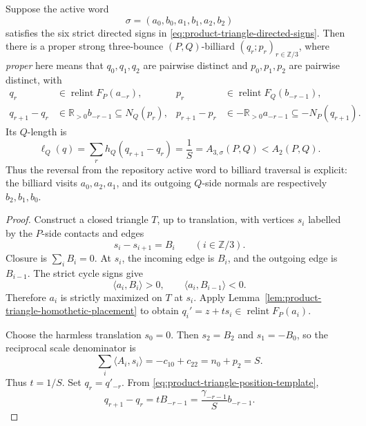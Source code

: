 \begin{unverified}
\begin{proposition}
\label{prop:product-triangle-strict-physical-realization}
Suppose the active word
\[
 \sigma=(a_0,b_0,a_1,b_1,a_2,b_2)
\]
satisfies the six strict directed signs in
\eqref{eq:product-triangle-directed-signs}.  Then there is a proper
strong three-bounce \((P,Q)\)-billiard
\((q_r;p_r)_{r\in\mathbb Z/3}\), where \emph{proper} here means that
\(q_0,q_1,q_2\) are pairwise distinct and \(p_0,p_1,p_2\) are pairwise
distinct, with
\begin{align}
 q_r&\in\operatorname{relint}F_P(a_{-r}),
 &p_r&\in\operatorname{relint}F_Q(b_{-r-1}),
 \label{eq:product-triangle-contact-order}\\
 q_{r+1}-q_r&\in\mathbb R_{>0}b_{-r-1}\subseteq N_Q(p_r),
 &p_{r+1}-p_r&\in-\mathbb R_{>0}a_{-r-1}\subseteq -N_P(q_{r+1}).
 \label{eq:product-triangle-strong-inclusions}
\end{align}
Its \(Q\)-length is
\begin{equation}
\label{eq:product-triangle-physical-length}
 \ell_Q(q)=\sum_r h_Q(q_{r+1}-q_r)
 =\frac1S=A_{3,\sigma}(P,Q)<A_2(P,Q).
\end{equation}
Thus the reversal from the repository active word to billiard traversal is
explicit: the billiard visits \(a_0,a_2,a_1\), and its outgoing \(Q\)-side
normals are respectively \(b_2,b_1,b_0\).
\end{proposition}

\begin{proof}
Construct a closed triangle \(T\), up to translation, with vertices \(s_i\)
labelled by the \(P\)-side contacts and edges
\begin{equation}
\label{eq:product-triangle-position-template}
 s_i-s_{i+1}=B_i
 \qquad(i\in\mathbb Z/3).
\end{equation}
Closure is \(\sum_iB_i=0\).  At \(s_i\), the incoming edge is \(B_i\),
and the outgoing edge is \(B_{i-1}\).  The strict cycle signs give
\[
 \langle a_i,B_i\rangle>0,
 \qquad \langle a_i,B_{i-1}\rangle<0.
\]
Therefore \(a_i\) is strictly maximized on \(T\) at \(s_i\).  Apply
Lemma~\ref{lem:product-triangle-homothetic-placement} to obtain
\(q_i'=z+t s_i\in\operatorname{relint}F_P(a_i)\).

Choose the harmless translation \(s_0=0\).  Then
\(s_2=B_2\) and \(s_1=-B_0\), so the reciprocal scale denominator is
\begin{equation}
\label{eq:product-triangle-position-denominator}
 \sum_i\langle A_i,s_i\rangle
 =-c_{10}+c_{22}=n_0+p_2=S.
\end{equation}
Thus \(t=1/S\).  Set \(q_r=q'_{-r}\).  From
\eqref{eq:product-triangle-position-template},
\[
 q_{r+1}-q_r=tB_{-r-1}
 =\frac{\gamma_{-r-1}}S b_{-r-1}.
\]


\end{proof}
\end{unverified}
